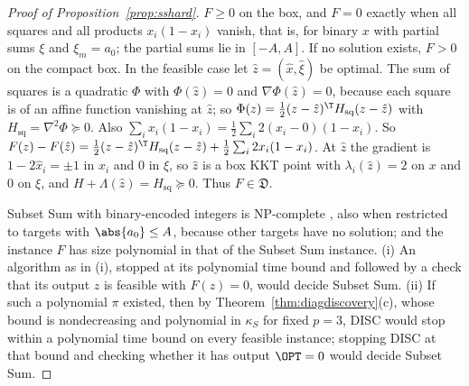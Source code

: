 \begin{proof}[Proof of Proposition~\ref{prop:sshard}]
$F\ge0$ on the box, and $F=0$ exactly when all squares and all products
$x_i(1-x_i)$ vanish, that is, for binary $x$ with partial sums $\xi$ and
$\xi_m=a_0$; the partial sums lie in $[-A,A]$. If no solution exists, $F>0$
on the compact box. In the feasible case let $\hat z=(\hat x,\hat\xi)$ be
optimal. The sum of squares is a quadratic $\Phi$ with $\Phi(\hat z)=0$ and
$\nabla\Phi(\hat z)=0$, because each square is of an affine function
vanishing at $\hat z$; so $\Phi(z)=\frac12(z-\hat z)^{\T}H_{\mathrm{sq}}
(z-\hat z)$ with $H_{\mathrm{sq}}=\nabla^2\Phi\succeq0$. Also
$\sum_ix_i(1-x_i)=\frac12\sum_i2(x_i-0)(1-x_i)$. So
$F(z)-F(\hat z)=\frac12(z-\hat z)^{\T}H_{\mathrm{sq}}(z-\hat z)
+\frac12\sum_i2x_i(1-x_i)$. At $\hat z$ the gradient is $1-2\hat x_i=\pm1$ in
$x_i$ and $0$ in $\xi$, so $\hat z$ is a box KKT point with
$\lambda_i(\hat z)=2$ on $x$ and $0$ on $\xi$, and
$H+\Lambda(\hat z)=H_{\mathrm{sq}}\succeq0$. Thus $F\in\mathfrak D$.

Subset Sum with binary-encoded integers is NP-complete
\cite{GareyJohnson1979}, also when restricted to targets with
$\abs{a_0}\le A$, because other targets have no solution; and the instance $F$
has size polynomial in that of the Subset Sum instance. (i) An algorithm as in (i), stopped at its
polynomial time bound and followed by a check that its output $z$ is
feasible with $F(z)=0$, would decide Subset Sum. (ii) If such a polynomial
$\pi$ existed, then by Theorem~\ref{thm:diagdiscovery}(c), whose bound is
nondecreasing and polynomial in $\kappa_S$ for fixed $p=3$, DISC would stop
within a polynomial time bound on every feasible instance; stopping DISC at that bound and
checking whether it has output $\OPT=0$ would decide Subset Sum.
\end{proof}

